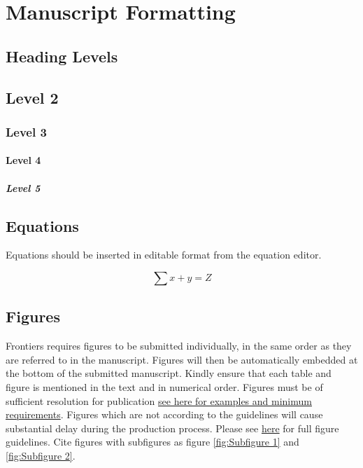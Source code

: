 \documentclass[utf8]{FrontiersinHarvard} %
\begin{document}
\section{Manuscript Formatting}

\subsection{Heading Levels}


\subsection{Level 2}
\subsubsection{Level 3}
\paragraph{Level 4}
\subparagraph{Level 5}

\subsection{Equations}
Equations should be inserted in editable format from the equation editor.

\begin{equation}
    \sum x+ y =Z\label{eq:01}
\end{equation}

\subsection{Figures}
Frontiers requires figures to be submitted individually, in the same order as they are referred to in the manuscript. Figures will then be automatically embedded at the bottom of the submitted manuscript. Kindly ensure that each table and figure is mentioned in the text and in numerical order. Figures must be of sufficient resolution for publication \href{https://www.frontiersin.org/about/author-guidelines#ImageSizeRequirements}{see here for examples and minimum requirements}. Figures which are not according to the guidelines will cause substantial delay during the production process. Please see \href{https://www.frontiersin.org/about/author-guidelines#FigureRequirementsStyleGuidelines}{here} for full figure guidelines. Cite figures with subfigures as figure \ref{fig:Subfigure 1} and \ref{fig:Subfigure 2}.
\end{document}
